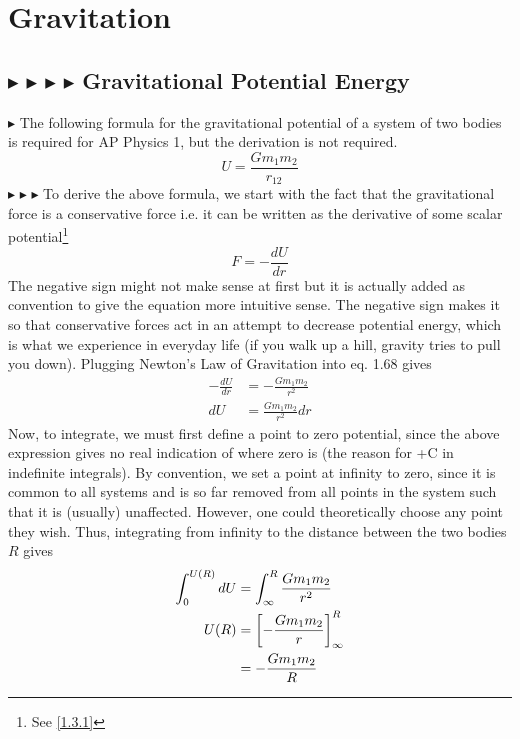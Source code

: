 \clearpage

\section{Gravitation}
\subsection{\color{OrangeRed} $\blacktriangleright$ \color{PineGreen} $\blacktriangleright$ \color{Goldenrod} $\blacktriangleright$ \color{Orchid} $\blacktriangleright$ \color{black} Gravitational Potential Energy}
\color{OrangeRed} $\blacktriangleright$ \color{black} The following formula for the gravitational potential of a system of two bodies is required for AP Physics 1, but the derivation is not required.
\begin{equation}
    U = \frac{Gm_1m_2}{r_{12}}
\end{equation}
\noindent \color{PineGreen} $\blacktriangleright$ \color{Goldenrod} $\blacktriangleright$ \color{Orchid} $\blacktriangleright$ \color{black} To derive the above formula, we start with the fact that the gravitational force is a conservative force i.e. it can be written as the derivative of some scalar potential\footnote{See \ref{1.3.1}}
\begin{equation}
    F = -\frac{dU}{dr}
\end{equation}
\noindent The negative sign might not make sense at first but it is actually added as convention to give the equation more intuitive sense. The negative sign makes it so that conservative forces act in an attempt to decrease potential energy, which is what we experience in everyday life (if you walk up a hill, gravity tries to pull you down). Plugging Newton's Law of Gravitation into eq. 1.68 gives
\begin{align*}
    -\frac{dU}{dr} &= -\frac{Gm_1m_2}{r^2} \\
    dU &= \frac{Gm_1m_2}{r^2}dr
\end{align*}
\noindent Now, to integrate, we must first define a point to zero potential, since the above expression gives no real indication of where zero is (the reason for +C in indefinite integrals). By convention, we set a point at infinity to zero, since it is common to all systems and is so far removed from all points in the system such that it is (usually) unaffected. However, one could theoretically choose any point they wish. Thus, integrating from infinity to the distance between the two bodies $R$ gives
\begin{align}
    \int_0^{U(R)} dU &= \int_{\infty}^R \frac{Gm_1m_2}{r^2} \nonumber \\
    U(R) &= \left[-\frac{Gm_1m_2}{r}\right]_{\infty}^{R} \nonumber \\
    &= -\frac{Gm_1m_2}{R}
\end{align}

